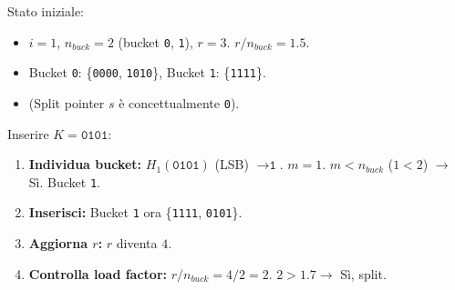 Stato iniziale:
\begin{itemize}
    \item $i = 1$, $n_{buck} = 2$ (bucket \texttt{0}, \texttt{1}), $r = 3$. $r/n_{buck} = 1.5$.
    \item Bucket \texttt{0}: \{\texttt{0000}, \texttt{1010}\}, Bucket \texttt{1}: \{\texttt{1111}\}.
    \item (Split pointer $s$ è concettualmente \texttt{0}).
\end{itemize}

Inserire $K = \texttt{0101}$:
\begin{enumerate}
    \item \textbf{Individua bucket:} $H_1(\texttt{0101})$ (LSB) $\rightarrow \texttt{1}$. $m=1$. $m < n_{buck}$ ($1 < 2$) $\rightarrow$ Sì. Bucket \texttt{1}.
    \item \textbf{Inserisci:} Bucket \texttt{1} ora \{\texttt{1111}, \texttt{0101}\}.
    \item \textbf{Aggiorna $r$:} $r$ diventa $4$.
    \item \textbf{Controlla load factor:} $r/n_{buck} = 4/2 = 2$. $2 > 1.7 \rightarrow$ Sì, split.
\end{enumerate}


